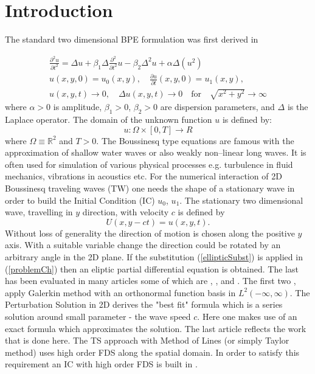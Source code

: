 \documentclass[%
 aip,
cp,  %
 amsmath,amssymb,%
 reprint,%
]{revtex4-2}
\newcommand{\be}{\begin{equation}}
\newcommand{\ee}{\end{equation}}
\newcommand{\rf}[1]{(\ref{#1})}
\newcommand{\RR}{\mathbb{R}}
\begin{document}
\section{\label{sec:level1}Introduction}

The standard two dimensional BPE formulation was first derived in \cite{ref1}

\begin{align}\label{problemCh}
 \frac{\partial^2 u}{\partial t^2}= \Delta u + \beta_1 \Delta \frac{\partial^2}{\partial t^2} u -  \beta_2 \Delta^2 u +  \alpha \Delta (u^2)
\\
u(x,y,0) = u_0(x,y), \quad \frac{\partial u}{\partial t}(x,y,0)=u_1(x,y), \nonumber
\\
u(x,y,t) \rightarrow 0, \quad \Delta u(x,y, t) \rightarrow 0 \quad \text{for} \quad \sqrt{x^2+y^2} \rightarrow \infty \nonumber
\end{align}
where $\alpha>0$ is amplitude, $\beta_1>0$, $\beta_2>0$  are dispersion parameters, and $\Delta$ is the Laplace operator. The domain of the unknown function $u$ is defined by:
\be
 u:\Omega \times [0, T] \rightarrow R
\ee
where $\Omega \equiv \RR^2$ and $T>0$. The Boussinesq type equations are famous with the approximation of shallow water waves or also weakly non--linear long waves. It is often used for simulation of various physical processes e.g. turbulence in fluid mechanics, vibrations in acoustics etc. For the numerical interaction of 2D Boussinesq traveling waves (TW) one needs the shape of a stationary wave in order to build the Initial Condition (IC) $u_0$, $u_1$. The stationary two dimensional wave, travelling in $y$ direction, with velocity $c$ is defined by
\be\label{ellipticSubst}
	U(x, y-ct) = u(x,y,t).
\ee
Without loss of generality the direction of motion is chosen along the positive $y$ axis. With a suitable variable change the direction could be rotated by an arbitrary angle in the 2D plane. If the substitution \rf{ellipticSubst} is applied in \rf{problemCh} then an eliptic partial differential equation is obtained. The last has been evaluated in many articles some of which are \cite{ref13}, \cite{ref14}, \cite{ref15} and \cite{ref16}. The first two \cite{ref13}, \cite{ref14} apply Galerkin method with an orthonormal function basis in $L^2(-\infty, \infty)$. The Perturbation Solution \cite{ref15} in 2D derives the "best fit" formula which is a series solution around small parameter - the wave speed $c$. Here one makes use of an exact formula which approximates the solution. The last article \cite{ref16} reflects the work that is done here. The TS approach with Method of Lines (or simply Taylor method) uses high order FDS along the spatial domain. In order to satisfy this requirement an IC with high order FDS is built in \cite{ref16}.
\end{document}
